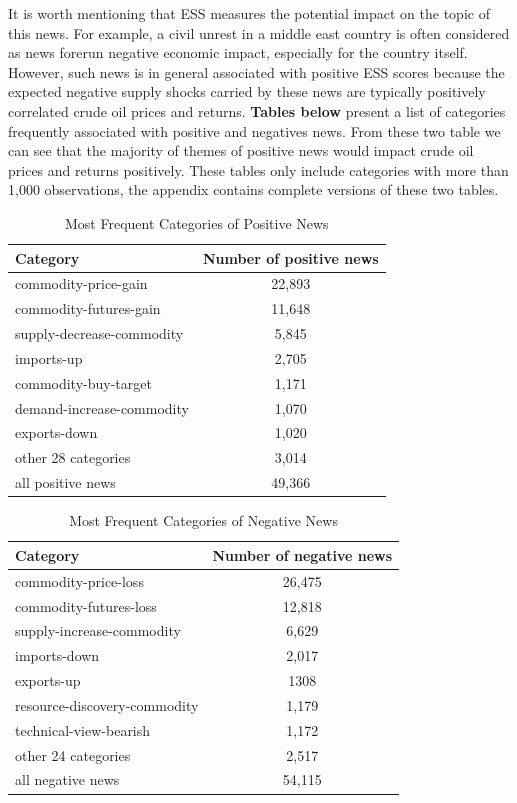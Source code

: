 \documentclass[12pt]{article}
\begin{document}
	\par It is worth mentioning that ESS measures the potential impact on the topic of this news. For example, a civil unrest in a middle east country is often considered as news forerun negative economic impact, especially for the country itself.
	However, such news is in general associated with positive ESS scores because the expected negative supply shocks carried by these news are typically positively correlated crude oil prices and returns. \textbf{Tables below} present a list of categories frequently associated with positive and negatives news. From these two table we can see that the majority of themes of positive news would impact crude oil prices and returns positively. These tables only include categories with more than 1,000 observations, the appendix contains complete versions of these two tables.
	\begin{table}[H]
		\centering
		\small
		\caption{Most Frequent Categories of Positive News}
		\begin{tabular}{l|c}
			\toprule
			Category & Number of positive news \\
			\midrule
			commodity-price-gain & 22,893 \\
			commodity-futures-gain & 11,648 \\
			supply-decrease-commodity & 5,845 \\
			imports-up & 2,705 \\
			commodity-buy-target & 1,171 \\
			demand-increase-commodity & 1,070 \\
			exports-down & 1,020 \\
			other 28 categories & 3,014 \\
			\midrule
			all positive news & 49,366 \\
			\bottomrule
		\end{tabular}
	\end{table}

	\begin{table}[H]
		\centering
		\small
		\caption{Most Frequent Categories of Negative News}
		\begin{tabular}{l|c}
			\toprule
			Category & Number of negative news \\
			\midrule
			commodity-price-loss & 26,475 \\
			commodity-futures-loss & 12,818 \\
			supply-increase-commodity & 6,629 \\
			imports-down & 2,017 \\
			exports-up & 1308 \\
			resource-discovery-commodity & 1,179 \\
			technical-view-bearish & 1,172 \\
			other 24 categories & 2,517 \\
			\midrule
			all negative news & 54,115 \\
			\bottomrule
		\end{tabular}
	\end{table}
	
\end{document}
